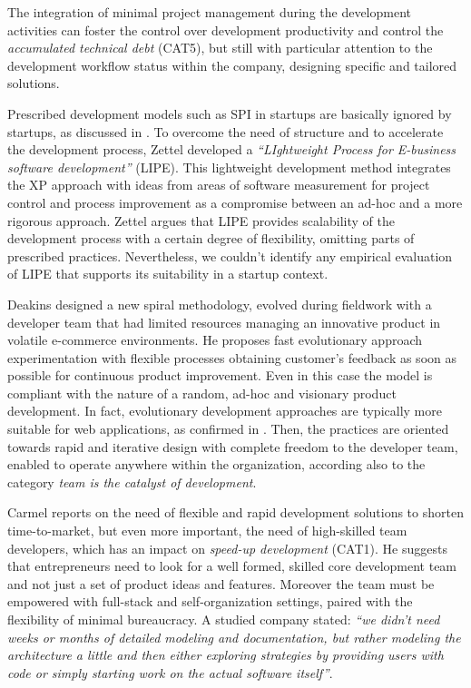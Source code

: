 \documentclass[10pt,journal,letterpaper,compsoc]{IEEEtran}
\begin{document}
The integration of minimal project management during the development activities can foster the control over development productivity and control the \textit{accumulated technical debt} (CAT5), but still with particular attention to the development workflow status within the company, designing specific and tailored solutions. 

Prescribed development models such as SPI in startups are basically ignored by startups, as discussed in \cite{Zettel2001}.%
To overcome the need of structure and to accelerate the development process, Zettel developed a \textit{``LIghtweight Process for E-business software development''} (LIPE). This lightweight development method integrates the XP approach with ideas from areas of software measurement for project control and process improvement as a compromise between an ad-hoc and a more rigorous approach. Zettel argues that LIPE provides scalability of the development process with a certain degree of flexibility, omitting parts of prescribed practices. Nevertheless, we couldn't identify any empirical evaluation of LIPE that supports its suitability in a startup context.


Deakins \cite{Deakins2005} designed a new spiral methodology, evolved during fieldwork with a developer team that had limited resources managing an innovative product in volatile e-commerce environments. He proposes fast evolutionary approach experimentation with flexible processes obtaining customer's feedback as soon as possible for continuous product improvement.%
Even in this case the model%
is compliant with the nature of a random, ad-hoc and visionary product development. In fact, evolutionary development approaches are typically more suitable  for web applications, as confirmed in \cite{Deshpande2001}. Then, the practices are oriented towards rapid and iterative design with complete freedom to the developer team, enabled to operate anywhere within the organization, according also to the category \textit{team is the catalyst of development}.%

Carmel \cite{Camel1994a} reports on the need of flexible and rapid development solutions to shorten time-to-market, but even more important, the need of high-skilled team developers, which has an impact on \textit{speed-up development} (CAT1). He suggests that entrepreneurs need to look for a well formed, skilled core development team and not just a set of product ideas and features. Moreover the team must be empowered with full-stack and self-organization settings, paired with the flexibility of minimal bureaucracy. A studied company stated: \textit{``we didn't need weeks or months of detailed modeling and documentation, but rather modeling the architecture a little and then either exploring strategies by providing users with code or simply starting work on the actual software itself''}.
\end{document}
